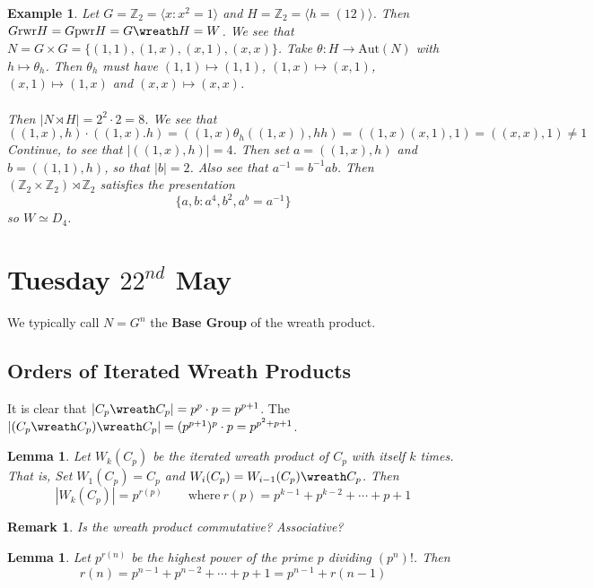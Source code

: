 \documentclass[a4paper,10pt]{article}
\newcommand{\ZZ}{\mathbb{Z}}
\newtheorem{eg}[thm]{Example}
\newtheorem{Lem}[thm]{Lemma}
\newtheorem{rem}[thm]{Remark}
\begin{document}
\begin{eg}
Let $G = \ZZ_2 = \langle x : x^2 =1 \rangle$ and $H = \ZZ_2 = \langle h = (12) \rangle$. Then $G \text{rwr} H = G \text{pwr} H = G \wreath H = W$. We see that $N = G \times G = \{ (1,1) , (1,x), (x,1), (x,x) \}$. Take $\theta : H \rightarrow \text{Aut}(N)$ with $h \mapsto \theta_h$. Then $\theta_h$ must have $(1,1) \mapsto (1,1)$, $(1,x) \mapsto (x,1)$, $(x,1) \mapsto (1,x)$ and $(x,x) \mapsto (x,x)$. \\
\\
Then $|N \rtimes H| = 2^2 \cdot 2 =8$. We see that
\[ ( (1,x), h) \cdot ((1,x). h) = ((1,x) \theta_h ((1,x)), hh) = ((1,x)(x,1), 1 ) = ((x,x),1) \neq 1 \]
Continue, to see that $|((1,x), h)| = 4$. Then set $a = ((1,x),h)$ and $b = ((1,1),h)$, so that $|b| = 2$. Also see that $a^{-1} = b^{-1} ab$. Then $(\ZZ_2 \times \ZZ_2) \rtimes \ZZ_2$ satisfies the presentation
\[ \{ a,b : a^4, b^2, a^b = a^{-1} \} \]
so $W \simeq D_4$. 
\end{eg}


\newpage
\section{Tuesday $22^{nd}$ May}

We typically call $N = G^n$ the \textbf{Base Group} of the wreath product. 

\subsection{Orders of Iterated Wreath Products}

It is clear that $| C_p \wreath C_p | = p^p \cdot p = p^{p+1}$. The $| (C_p \wreath C_p) \wreath C_p | = (p^{p+1})^p \cdot p = p^{p^2 + p + 1}$.


\begin{Lem}
Let $W_k (C_p) $ be the iterated wreath product of $C_p$ with itself $k$ times. That is, Set $W_1(C_p) = C_p$ and $W_i (C_p) = W_{i-1} (C_p)\wreath C_p$. Then 
\[ |W_k (C_p)| = p^{r(p)} \qquad \text{where} \ r(p) = p^{k-1} + p^{k-2} + \cdots + p + 1 \]
\end{Lem}

\begin{rem}
Is the wreath product commutative? Associative?
\end{rem}

\begin{Lem}
Let $p^{r(n)}$ be the highest power of the prime $p$ dividing $(p^n)!$. Then
\[ r(n) = p^{n-1} + p^{n-2} + \cdots + p + 1 = p^{n-1} + r(n-1)\]
\end{Lem}
\end{document}
